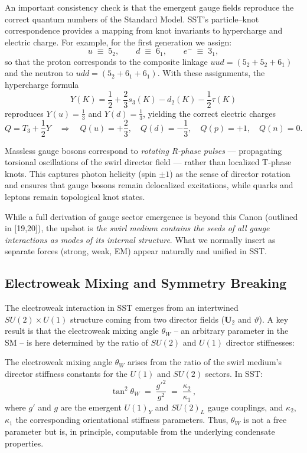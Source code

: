 \documentclass[10pt,reprint,aps,onecolumn,nofootinbib]{revtex4-2}
\begin{document}
        \noindent
        An important consistency check is that the emergent gauge fields reproduce the correct quantum numbers of the Standard Model.
        SST’s particle–knot correspondence provides a mapping from knot invariants to hypercharge and electric charge.
        For example, for the first generation we assign:
        \[
            u \;\equiv\; 5_2, \qquad d \;\equiv\; 6_1, \qquad e^- \;\equiv\; 3_1,
        \]
        so that the proton corresponds to the composite linkage $uud = (5_2 + 5_2 + 6_1)$ and the neutron to $udd = (5_2 + 6_1 + 6_1)$.
        With these assignments, the hypercharge formula
        \[
            Y(K) = \frac{1}{2} + \frac{2}{3}s_3(K) - d_2(K) - \frac{1}{2}\tau(K)
        \]
        reproduces $Y(u) = \tfrac{1}{3}$ and $Y(d) = \tfrac{1}{3}$, yielding the correct electric charges
        \[
            Q = T_3 + \frac{1}{2}Y \quad \Rightarrow \quad
            Q(u) = +\frac{2}{3}, \quad Q(d) = -\frac{1}{3}, \quad Q(p)=+1, \quad Q(n)=0.
        \]

        \noindent
        Massless gauge bosons correspond to \emph{rotating R-phase pulses} — propagating torsional oscillations of the swirl director field — rather than localized T-phase knots.
        This captures photon helicity (spin $\pm 1$) as the sense of director rotation and ensures that gauge bosons remain delocalized excitations, while quarks and leptons remain topological knot states.



	While a full derivation of gauge sector emergence is beyond this Canon (outlined in [19,20]), the upshot is \emph{the swirl medium contains the seeds of all gauge interactions as modes of its internal structure}. What we normally insert as separate forces (strong, weak, EM) appear naturally and unified in SST.

	\subsection*{Electroweak Mixing and Symmetry Breaking}
	The electroweak interaction in SST emerges from an intertwined $SU(2)\times U(1)$ structure coming from two director fields ($\mathbf{U}_2$ and $\vartheta$). A key result is that the electroweak mixing angle $\theta_W$ – an arbitrary parameter in the SM – is here determined by the ratio of $SU(2)$ and $U(1)$ director stiffnesses:

	\begin{tcolorbox}[title=Theorem 6.2: Weak Mixing Angle from First Principles]
		The electroweak mixing angle $\theta_W$ arises from the ratio of the swirl medium’s director stiffness constants for the $U(1)$ and $SU(2)$ sectors. In SST:
		\[
			\tan^2 \theta_W \;=\; \frac{g'^2}{g^2} \;=\; \frac{\kappa_2}{\kappa_1}\,,
		\]
		where $g'$ and $g$ are the emergent $U(1)_Y$ and $SU(2)_L$ gauge couplings, and $\kappa_2$, $\kappa_1$ the corresponding orientational stiffness parameters. Thus, $\theta_W$ is not a free parameter but is, in principle, computable from the underlying condensate properties.
	\end{tcolorbox}
\end{document}
